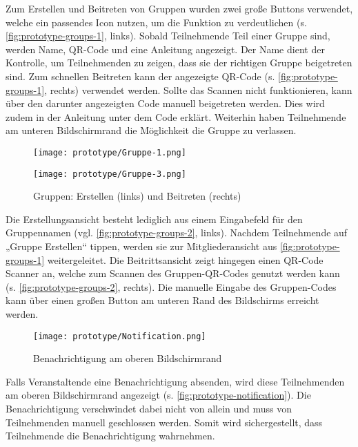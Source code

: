 Zum Erstellen und Beitreten von Gruppen wurden zwei große Buttons verwendet,
welche ein passendes Icon nutzen, um die Funktion zu verdeutlichen (s.
\autoref{fig:prototype-groups-1}, links). Sobald Teilnehmende Teil einer Gruppe
sind, werden Name, QR-Code und eine Anleitung angezeigt. Der Name dient der
Kontrolle, um Teilnehmenden zu zeigen, dass sie der richtigen Gruppe beigetreten
sind. Zum schnellen Beitreten kann der angezeigte QR-Code (s.
\autoref{fig:prototype-groups-1}, rechts) verwendet werden. Sollte das Scannen
nicht funktionieren, kann über den darunter angezeigten Code manuell beigetreten
werden. Dies wird zudem in der Anleitung unter dem Code erklärt. Weiterhin haben
Teilnehmende am unteren Bildschirmrand die Möglichkeit die Gruppe zu verlassen.

\begin{figure}[htpb]
    \begin{minipage}{.5\textwidth}
        \centering
        \texttt{[image: prototype/Gruppe-1.png]}
    \end{minipage}%
    \begin{minipage}{.5\textwidth}
        \centering
        \texttt{[image: prototype/Gruppe-3.png]}
    \end{minipage}
    \caption{Gruppen: Erstellen (links) und Beitreten (rechts)}
    \label{fig:prototype-groups-2}
\end{figure}

Die Erstellungsansicht besteht lediglich aus einem Eingabefeld für den
Gruppennamen (vgl. \autoref{fig:prototype-groups-2}, links). Nachdem
Teilnehmende auf „Gruppe Erstellen“ tippen, werden sie zur Mitgliederansicht aus
\autoref{fig:prototype-groups-1} weitergeleitet. Die Beitrittsansicht zeigt
hingegen einen QR-Code Scanner an, welche zum Scannen des Gruppen-QR-Codes
genutzt werden kann (s. \autoref{fig:prototype-groups-2}, rechts). Die manuelle
Eingabe des Gruppen-Codes kann über einen großen Button am unteren Rand des Bildschirms
erreicht werden.

\begin{figure}[htpb]
    \centering
    \texttt{[image: prototype/Notification.png]}
    \caption{Benachrichtigung am oberen Bildschirmrand}
    \label{fig:prototype-notification}
\end{figure}

Falls Veranstaltende eine Benachrichtigung absenden, wird diese Teilnehmenden am
oberen Bildschirmrand angezeigt (s. \autoref{fig:prototype-notification}). Die
Benachrichtigung verschwindet dabei nicht von allein und muss von Teilnehmenden
manuell geschlossen werden. Somit wird sichergestellt, dass Teilnehmende die
Benachrichtigung wahrnehmen.


